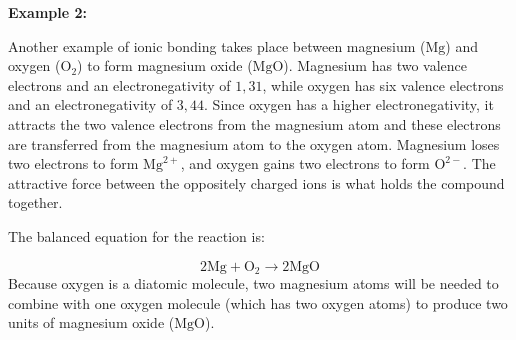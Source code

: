         \label{m38684*id142353}
          \textbf{Example 2:}
        \par 
        \label{m38684*id142360}Another example of ionic bonding takes place between magnesium ($\text{Mg}$) and oxygen ($\text{O}_2$) to form magnesium oxide ($\text{MgO}$). Magnesium has two valence electrons and an electronegativity of $1,31$, while oxygen has six valence electrons and an electronegativity of $3,44$. Since oxygen has a higher electronegativity, it attracts the two valence electrons from the magnesium atom and these electrons are transferred from the magnesium atom to the oxygen atom. Magnesium loses two electrons to form ${\text{Mg}}^{2+}$, and oxygen gains two electrons to form ${\text{O}}^{2-}$. The attractive force between the oppositely charged ions is what holds the compound together.\par 
        \label{m38684*id138529}The balanced equation for the reaction is:\par 
        \label{m38684*id138535}\nopagebreak\noindent{}
    \begin{equation*}
    2\text{Mg}+{\text{O}}_{2}\to 2\text{MgO}
      \end{equation*}
        \label{m38684*id142521}Because oxygen is a diatomic molecule, two magnesium atoms will be needed to combine with one oxygen molecule (which has two oxygen atoms) to produce two units of magnesium oxide ($\text{MgO}$).\par 
% 
% 
% 			
% 		
% 		
% 	

